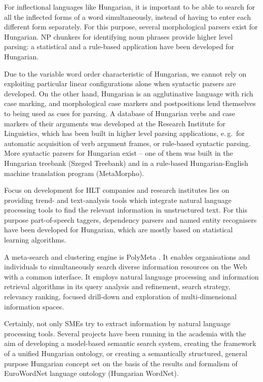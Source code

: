 \begin{multicols}{2}
For inflectional languages like Hungarian, it is important to be able to search for all the inflected forms of a word simultaneously, instead of having to enter each different form separately. For this purpose, several morphological parsers exist for Hungarian. NP chunkers for identifying noun phrases provide higher level parsing: a statistical and a rule-based application have been developed for Hungarian. 

Due to the variable word order characteristic of Hungarian, we cannot rely on exploiting particular linear configurations alone when syntactic parsers are developed. On the other hand, Hungarian is an agglutinative language with rich case marking, and morphological case markers and postpositions lend themselves to being used as cues for parsing. A database of Hungarian verbs and case markers of their arguments was developed at the Research Institute for Linguistics, which has been built in higher level parsing applications, e.\,g.~for automatic acquisition of verb argument frames, or rule-based syntactic parsing. More syntactic parsers for Hungarian exist -- one of them was built in the Hungarian treebank (Szeged Treebank) and in a rule-based Hungarian-English machine translation program (MetaMorpho).

Focus on development for HLT companies and research institutes lies on providing trend- and text-analysis tools which integrate natural language processing tools to find the relevant information in unstructured text. For this purpose part-of-speech taggers, dependency parsers and named entity recognisers have been developed for Hungarian, which are mostly based on statistical learning algorithms.

A meta-search and clustering engine is PolyMeta \cite{polymeta}. It enables organisations and individuals to simultaneously search diverse information resources on the Web with a common interface. It employs natural language processing and information retrieval algorithms in its query analysis and refinement, search strategy, relevancy ranking, focused drill-down and exploration of multi-dimensional information spaces.

Certainly, not only SMEs try to extract information by natural language processing tools. Several projects have been running in the academia with the aim of developing a model-based semantic search system, creating the framework of a unified Hungarian ontology, or creating a semantically structured, general purpose Hungarian concept set on the basis of the results and formalism of EuroWordNet language ontology (Hungarian WordNet).


\end{multicols}

